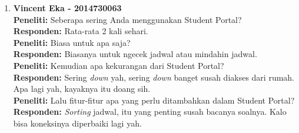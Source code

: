 \begin{enumerate}
	\item\textbf{Vincent Eka - 2014730063}\\
	\textbf{Peneliti:} Seberapa sering Anda menggunakan Student Portal?\\
	\textbf{Responden:} Rata-rata 2 kali sehari.\\
	\textbf{Peneliti:} Biasa untuk apa saja?\\
	\textbf{Responden:} Biasanya untuk ngecek jadwal atau mindahin jadwal.\\
	\textbf{Peneliti:} Kemudian apa kekurangan dari Student Portal?\\
	\textbf{Responden:} Sering \textit{down} yah, sering \textsl{down} banget susah diakses dari rumah. Apa lagi yah, kayaknya itu doang sih.\\
	\textbf{Peneliti:} Lalu fitur-fitur apa yang perlu ditambahkan dalam Student Portal?\\
	\textbf{Responden:} \textit{Sorting} jadwal, itu yang penting susah bacanya soalnya. Kalo bisa koneksinya diperbaiki lagi yah.\\
\end{enumerate}
	
